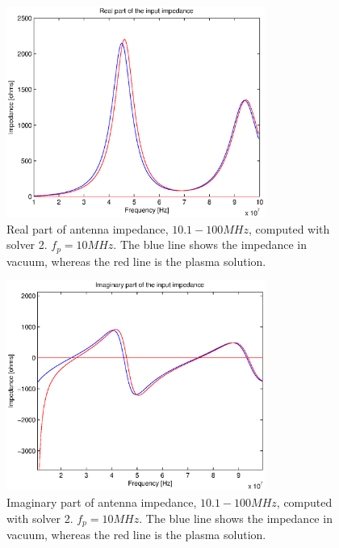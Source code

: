 \documentclass[draft,ras]{agutex}
\begin{document}
\begin{article}
\begin{figure}
  \noindent\includegraphics[width=20pc]{imps_dipole_solver2_real2.eps}
\caption{Real part of antenna impedance, $10.1 - 100 MHz$, computed with solver 2. $f_p=10MHz$. The blue line shows the impedance in vacuum, whereas the red line is the plasma solution.}
\label{fig:impedances_dipole_solver2_2_real}
\end{figure}

\begin{figure}
\noindent\includegraphics[width=20pc]{imps_dipole_solver2_imag2.eps}
\caption{Imaginary part of antenna impedance, $10.1 - 100 MHz$, computed with solver 2. $f_p=10MHz$. The blue line shows the impedance in vacuum, whereas the red line is the plasma solution.}
\label{fig:impedances_dipole_solver2_2_imag}
\end{figure}


\end{article}
\end{document}

